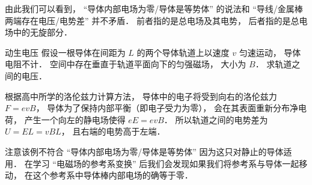 由此我们可以看到， “导体内部电场为零/导体是等势体” 的说法和 “导线/金属棒两端存在电压/电势差” 并不矛盾． 前者指的是总电场及其电势， 后者指的是总电场中的无旋部分．

\begin{example}{动生电压}
假设一根导体在间距为 $L$ 的两个导体轨道上以速度 $v$ 匀速运动， 导体电阻不计． 空间中存在垂直于轨道平面向下的匀强磁场， 大小为 $B$． 求轨道之间的电压．

根据高中所学的洛伦兹力计算方法， 导体中的电子将受到向右的洛伦兹力 $F = evB$， 导体为了保持内部平衡（即电子受力为零）， 会在其表面重新分布净电荷， 产生一个向左的静电场使得 $eE = evB$． 所以轨道之间的电势差为 $U = EL = vBL$， 且右端的电势高于左端．
\end{example}

注意该例不符合 “导体内部电场为零/导体是等势体” 因为这只对静止的导体适用． 在学习 “电磁场的参考系变换” 后我们会发现如果我们将参考系与导体一起移动， 在这个参考系中导体棒内部电场的确等于零．
